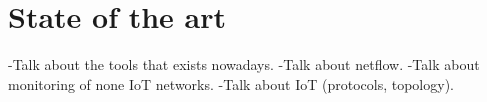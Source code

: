 \section{State of the art}

-Talk about the tools that exists nowadays.
-Talk about netflow.
-Talk about monitoring of none IoT networks.
-Talk about IoT (protocols, topology).
